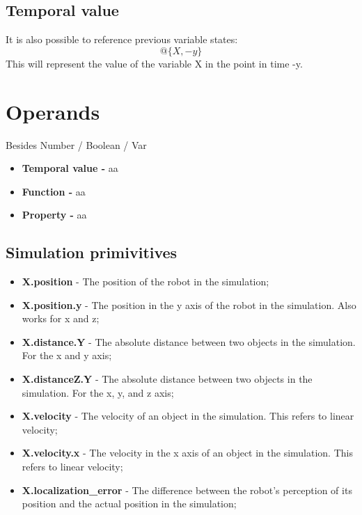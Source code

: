 
\subsection{Temporal value}

It is also possible to reference previous variable states:
\begin{equation}
@\{X, -y\}
\end{equation}
This will represent the value of the variable X in the point in time -y.

\section{Operands}

Besides Number / Boolean / Var

\begin{itemize}
\item \textbf{Temporal value -} aa
\item \textbf{Function -} aa
\item \textbf{Property -} aa
\end{itemize}

\subsection{Simulation primivitives}

\begin{itemize}
\item {\bfseries X.position} - The position of the robot in the simulation;
\item {\bfseries X.position.y} - The position in the y axis of the robot in the simulation. Also works for x and z;
\item {\bfseries X.distance.Y} - The absolute distance between two objects in the simulation. For the x and y axis;
\item {\bfseries X.distanceZ.Y} - The absolute distance between two objects in the simulation. For the x, y, and z axis;
\item {\bfseries X.velocity} - The velocity of an object in the simulation. This refers to linear velocity;
\item {\bfseries X.velocity.x} - The velocity in the x axis of an object in the simulation. This refers to linear velocity;
\item {\bfseries X.localization\_error} - The difference between the robot's perception of its position and the actual position in the simulation;
\end{itemize}

